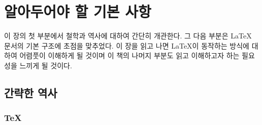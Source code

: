 
\chapter{알아두어야 할 기본 사항}
\begin{intro}
이 장의 첫 부분에서  철학과 역사에 대하여 간단히 개관한다.
그 다음 부분은 \LaTeX{} 문서의 기본 구조에 초점을 맞추었다.
이 장을 읽고 나면 \LaTeX 이 동작하는 방식에 대하여 어렴풋이 이해하게 될 것이며
이 책의 나머지 부분도 읽고 이해하고자 하는 필요성을 느끼게 될 것이다.
\end{intro}

\section{간략한 역사}
\subsection{\protect\TeX}

